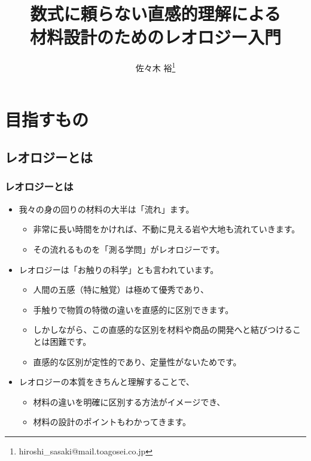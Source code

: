 \documentclass[12pt, dvipdfmx]{beamer}
\title
{数式に頼らない直感的理解による\\
材料設計のためのレオロジー入門}
\author[東亞合成　佐々木]{佐々木 裕\thanks{hiroshi\_sasaki@mail.toagosei.co.jp}}
\institute[東亞合成]{東亞合成株式会社}
\date{}
\begin{document}
\maketitle

\section{目指すもの}

\subsection{レオロジーとは}
\begin{frame}
	\frametitle{レオロジーとは}
	\begin{itemize}
		\item 我々の身の回りの材料の大半は「流れ」ます。
			\begin{itemize}
				\item 非常に長い時間をかければ、不動に見える岩や大地も流れていきます。
				\item その流れるものを「測る学問」がレオロジーです。
			\end{itemize}
		\item レオロジーは「お触りの科学」とも言われています。
			\begin{itemize}
				\item 人間の五感（特に触覚）は極めて優秀であり、
				\item 手触りで物質の特徴の違いを直感的に区別できます。
				\item しかしながら、この直感的な区別を材料や商品の開発へと結びつけることは困難です。
				\item 直感的な区別が定性的であり、定量性がないためです。
			\end{itemize}
		\item レオロジーの本質をきちんと理解することで、
			\begin{itemize}
				\item 材料の違いを明確に区別する方法がイメージでき、
				\item 材料の設計のポイントもわかってきます。
			\end{itemize}
	\end{itemize}
\end{frame}
\end{document}
